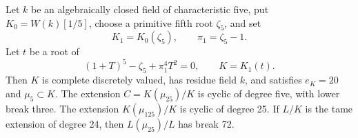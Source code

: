 \begin{lemma}
\label{lem:B-RD89-base}
Let \(k\) be an algebraically closed field of characteristic five,
put \(K_0=W(k)[1/5]\), choose a primitive fifth root \(\zeta_5\),
and set
\[
 K_1=K_0(\zeta_5),\qquad \pi_1=\zeta_5-1.
\]
Let \(t\) be a root of
\[
       (1+T)^5-\zeta_5+\pi_1^4T^2=0,
       \qquad K=K_1(t).                              \tag{B-RD89.1}
\]
Then \(K\) is complete discretely valued, has residue field \(k\),
and satisfies \(e_K=20\) and \(\mu_5\subset K\).
The extension \(C=K(\mu_{25})/K\) is cyclic of degree five,
with lower break three. The extension \(K(\mu_{125})/K\)
is cyclic of degree 25. If \(L/K\) is the tame extension
of degree 24, then \(L(\mu_{25})/L\) has break 72.
\end{lemma}
